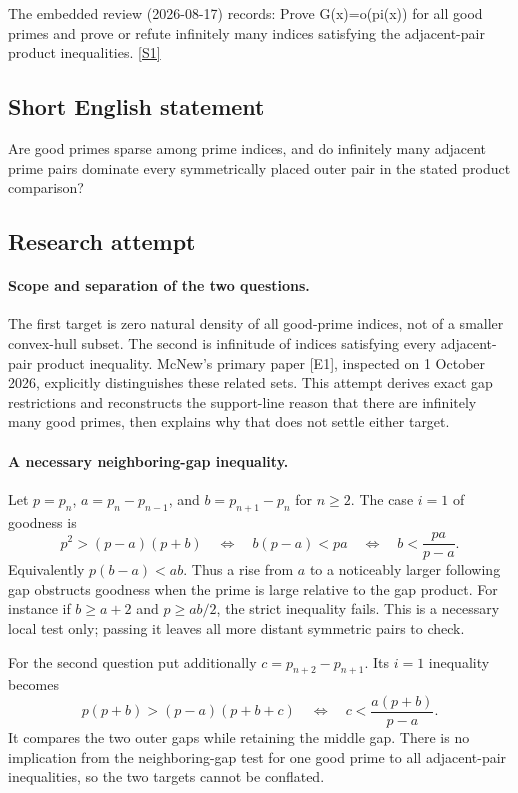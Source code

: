 \documentclass[11pt,a4paper]{article}
\newcommand{\sref}[2]{\hyperlink{source:#1:#2}{[S#2]}}
\begin{document}
The embedded review (2026-08-17) records: Prove G(x)=o(pi(x)) for all good primes and prove or refute infinitely many indices satisfying the adjacent-pair product inequalities. \sref{statement}{1}

\subsection{Short English statement}

Are good primes sparse among prime indices, and do infinitely many adjacent prime pairs dominate every symmetrically placed outer pair in the stated product comparison?

\subsection{Research attempt}

\paragraph{Scope and separation of the two questions.}
The first target is zero natural density of all good-prime indices,
not of a smaller convex-hull subset. The second is infinitude of
indices satisfying every adjacent-pair product inequality. McNew's
primary paper [E1], inspected on 1 October 2026, explicitly distinguishes
these related sets. This attempt derives exact gap restrictions and
reconstructs the support-line reason that there are infinitely many
good primes, then explains why that does not settle either target.

\paragraph{A necessary neighboring-gap inequality.}
Let $p=p_n$, $a=p_n-p_{n-1}$, and $b=p_{n+1}-p_n$ for $n\ge2$.
The case $i=1$ of goodness is
\[
 p^2>(p-a)(p+b)
 \quad\Longleftrightarrow\quad b(p-a)<pa
 \quad\Longleftrightarrow\quad b<\frac{pa}{p-a}.
\]
Equivalently $p(b-a)<ab$. Thus a rise from $a$ to a noticeably
larger following gap obstructs goodness when the prime is large
relative to the gap product. For instance if $b\ge a+2$ and
$p\ge ab/2$, the strict inequality fails. This is a necessary local
test only; passing it leaves all more distant symmetric pairs to check.

For the second question put additionally
$c=p_{n+2}-p_{n+1}$. Its $i=1$ inequality becomes
\[
 p(p+b)>(p-a)(p+b+c)
 \quad\Longleftrightarrow\quad
                      c<\frac{a(p+b)}{p-a}.
\]
It compares the two outer gaps while retaining the middle gap. There
is no implication from the neighboring-gap test for one good prime to
all adjacent-pair inequalities, so the two targets cannot be conflated.
\end{document}
